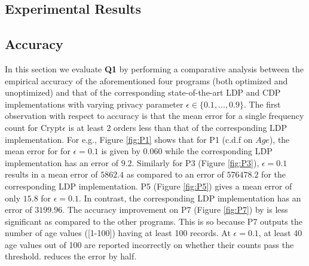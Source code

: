 \subsection{Experimental Results}\label{exp:results}
\subsection*{Accuracy}
In this section we evaluate \textbf{Q1} by performing a comparative analysis between the empirical accuracy of the aforementioned four \system programs (both optimized and unoptimized) and that of the corresponding state-of-the-art \textsf{LDP} \cite{LDP1} and \textsf{CDP} \cite{Dork} implementations  with varying privacy parameter $\epsilon \in \{0.1,...,0.9\}$. %
The first observation with respect to accuracy is that the mean error for a single frequency count for Crypt$\epsilon$ is at least 2 orders less than that of the corresponding \textsf{LDP} implementation.   For e.g., Figure \ref{fig:P1} shows that for P1 (c.d.f on $Age$), the mean error for \system for $\epsilon=0.1$ is given by $0.060$ while the corresponding \textsf{LDP} implementation has an error of $9.2$. Similarly for P3 (Figure \ref{fig:P3}),  $\epsilon=0.1$ results in a mean error of $5862.4$ as compared to an error of $576478.2$ for the corresponding \textsf{LDP} implementation. P5 (Figure \ref{fig:P5}) gives a mean error of only $15.8$ for $\epsilon=0.1$. In contrast, the corresponding \textsf{LDP} implementation has an error of $3199.96$.   The accuracy
improvement on P7 (Figure \ref{fig:P7}) by \system is less significant as compared to the other programs. This is so because P7 outputs the number of age values ([1-100]) having at least
100 records. At $\epsilon=0.1$, at least 40 age values out of 100 are
reported incorrectly on whether their counts pass the threshold. \system reduces the error by half. 


